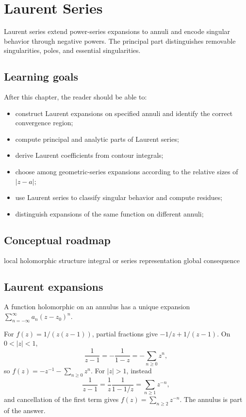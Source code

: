 \chapter{Laurent Series}
\label{ch:iv08}

Laurent series extend power-series expansions to annuli and encode singular behavior through negative powers. The principal part distinguishes removable singularities, poles, and essential singularities.

\section*{Learning goals}
After this chapter, the reader should be able to:
\begin{itemize}
\item construct Laurent expansions on specified annuli and identify the correct convergence region;
\item compute principal and analytic parts of Laurent series;
\item derive Laurent coefficients from contour integrals;
\item choose among geometric-series expansions according to the relative sizes of \(|z-a|\);
\item use Laurent series to classify singular behavior and compute residues;
\item distinguish expansions of the same function on different annuli;
\end{itemize}
\section*{Conceptual roadmap}
\volroadmap
  {local holomorphic structure}
  {integral or series representation}
  {global consequence}

\section{Laurent expansions}
A function holomorphic on an annulus has a unique expansion $\sum_{n=-\infty}^{\infty}a_n(z-z_0)^n$.

\begin{example}\label{ex:iv08-expand-01}
For \(f(z)=1/(z(z-1))\), partial fractions give \(-1/z+1/(z-1)\). On \(0<|z|<1\),
\[
\frac1{z-1}=-\frac1{1-z}=-\sum_{n\ge0}z^n,
\]
so \(f(z)=-z^{-1}-\sum_{n\ge0}z^n\). For \(|z|>1\), instead
\[
\frac1{z-1}=\frac1z\frac1{1-1/z}=\sum_{n\ge1}z^{-n},
\]
and cancellation of the first term gives \(f(z)=\sum_{n\ge2}z^{-n}\). The annulus is part of the answer.
\end{example}
